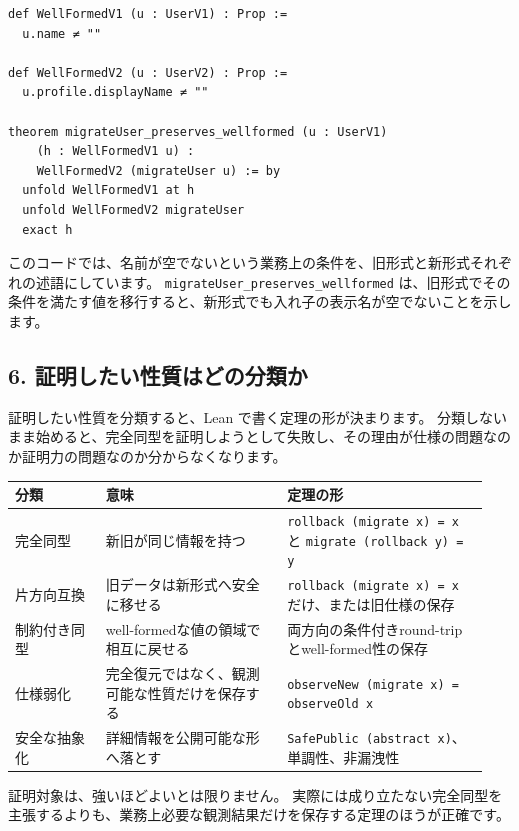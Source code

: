 \begin{listing}[htbp]
\begin{verbatim}
def WellFormedV1 (u : UserV1) : Prop :=
  u.name ≠ ""

def WellFormedV2 (u : UserV2) : Prop :=
  u.profile.displayName ≠ ""

theorem migrateUser_preserves_wellformed (u : UserV1)
    (h : WellFormedV1 u) :
    WellFormedV2 (migrateUser u) := by
  unfold WellFormedV1 at h
  unfold WellFormedV2 migrateUser
  exact h
\end{verbatim}
\caption{\texttt{WellFormedV1}・\texttt{WellFormedV2}・\texttt{migrateUser\_preserves\_wellformed}}
\label{lst:appD_wellformed}
\end{listing}

このコードでは、名前が空でないという業務上の条件を、旧形式と新形式それぞれの述語にしています。
\texttt{migrateUser\_preserves\_wellformed} は、旧形式でその条件を満たす値を移行すると、新形式でも入れ子の表示名が空でないことを示します。

\subsection{6. 証明したい性質はどの分類か}

証明したい性質を分類すると、Lean で書く定理の形が決まります。
分類しないまま始めると、完全同型を証明しようとして失敗し、その理由が仕様の問題なのか証明力の問題なのか分からなくなります。

\begin{longtable}{@{}p{0.18\linewidth}p{0.36\linewidth}p{0.40\linewidth}@{}}
\toprule
分類 & 意味 & 定理の形 \\
\midrule
\endhead
完全同型 & 新旧が同じ情報を持つ & \texttt{rollback (migrate x) = x} と \texttt{migrate (rollback y) = y} \\
片方向互換 & 旧データは新形式へ安全に移せる & \texttt{rollback (migrate x) = x} だけ、または旧仕様の保存 \\
制約付き同型 & well-formedな値の領域で相互に戻せる & 両方向の条件付きround-tripとwell-formed性の保存 \\
仕様弱化 & 完全復元ではなく、観測可能な性質だけを保存する & \texttt{observeNew (migrate x) = observeOld x} \\
安全な抽象化 & 詳細情報を公開可能な形へ落とす & \texttt{SafePublic (abstract x)}、単調性、非漏洩性 \\
\bottomrule
\end{longtable}

証明対象は、強いほどよいとは限りません。
実際には成り立たない完全同型を主張するよりも、業務上必要な観測結果だけを保存する定理のほうが正確です。

